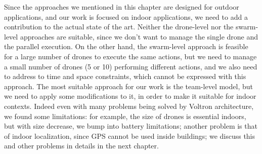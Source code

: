 Since the approaches we mentioned in this chapter are designed for outdoor applications, and our work is focused on indoor applications, we need to add a contribution to the actual state of the art.
Neither the drone-level nor the swarm-level approaches are suitable, since  we don't want  to manage the single drone and the parallel execution.
On the other hand, the swarm-level approach is feasible for a large number of drones to execute the same actions, but we need to manage a small number of drones (5 or 10) performing different actions, and we also need to address to time and space constraints, which cannot be expressed with this approach.
The most suitable approach for our work is the team-level model, but we need to apply some modifications to it, in order to make it suitable for indoor contexts.
Indeed even with many problems being solved by Voltron\cite{voltron} architecture, we found some limitations: for example, the size of drones is essential indoors, but with size decrease, we bump into battery limitations; another problem is that of indoor localization, since GPS cannot be used inside buildings; we discuss this and other problems in details in the next chapter.

























